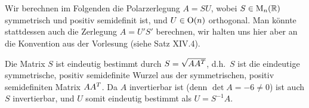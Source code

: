 \section{}

Wir berechnen im Folgenden die Polarzerlegung $A = SU$, wobei $S \in \operatorname{M}_{n}(\mathbb{R})$ symmetrisch und positiv semidefinit ist, und $U \in \operatorname{O}(n)$ orthogonal.
Man könnte stattdessen auch die Zerlegung $A = U'S'$ berechnen, wir halten uns hier aber an die Konvention aus der Vorlesung (siehe Satz XIV.4).

Die Matrix $S$ ist eindeutig bestimmt durch $S = \sqrt{A A^T}$, d.h.\ $S$ ist die eindeutige symmetrische, positiv semidefinite Wurzel aus der symmetrischen, positiv semidefiniten Matrix $A A^T$.
Da $A$ invertierbar ist (denn $\det A = -6 \neq 0$) ist auch $S$ invertierbar, und $U$ somit eindeutig bestimmt als $U = S^{-1} A$.

